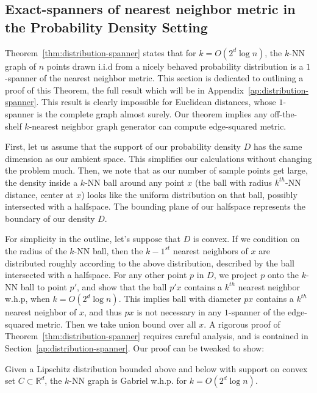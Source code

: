 \subsection{Exact-spanners of nearest neighbor metric in
the Probability Density Setting
}\label{sec:distribution-spanner}

Theorem~\ref{thm:distribution-spanner} states that for $k= O(2^d \log n)$, the $k$-NN graph of $n$ points drawn i.i.d from
a nicely behaved probability distribution is a $1$-spanner of the
nearest neighbor metric. This section is dedicated to outlining a proof of
this Theorem, the full result which will be in
Appendix~\ref{ap:distribution-spanner}.
This result is clearly impossible for Euclidean distances,
whose $1$-spanner is the complete graph almost surely.  
Our theorem implies any off-the-shelf
$k$-nearest neighbor graph generator can compute
edge-squared metric. 

First, let us assume that the support of our
probability density $D$ has the same dimension as our ambient space.
This simplifies our calculations without changing the problem
much. Then, we note that as our number of sample points get
large, the density inside a $k$-NN ball around any point $x$ (the ball with radius
$k^{th}$-NN
distance, center at $x$) looks like the uniform distribution
on that ball, possibly intersected with a halfspace. The bounding
plane of our halfspace
represents the boundary of our density $D$.

For simplicity in the outline, let's suppose that $D$ is convex.
If we condition on
the radius of the $k$-NN ball, then the $k-1^{st}$ nearest
neighbors of $x$ are distributed roughly according to the above
distribution, described by the ball intersected with a halfspace.
For any other point $p$ in $D$, we project $p$ onto the $k$-NN
ball to point $p'$, and show that the ball $p'x$ contains a $k^{th}$ nearest
neighbor w.h.p, when $k=O(2^d \log n)$. This
implies ball with diameter $px$ contains a $k^{th}$ nearest
neighbor of $x$, and thus $px$ is not necessary in any
$1$-spanner of the edge-squared metric. Then we take union bound
over all $x$.
A rigorous proof of
Theorem~\ref{thm:distribution-spanner} requires careful analysis, 
and is contained in
Section~\ref{ap:distribution-spanner}.  
Our proof can be tweaked to show:
\begin{theorem}
  Given a Lipschitz distribution bounded above and below with support on convex set $C \subset
  \mathbb{R}^d$, the $k$-NN graph is Gabriel w.h.p. for $k =
  O(2^d \log n)$.
\end{theorem}
